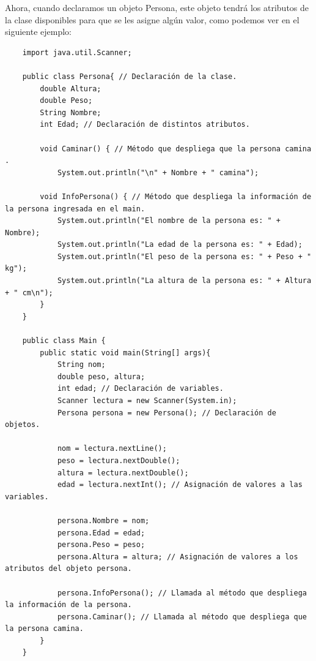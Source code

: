 Ahora, cuando declaramos un objeto Persona, este objeto tendrá los atributos de la clase disponibles para que se les asigne algún valor, como podemos ver en el siguiente ejemplo:
\begin{lstlisting}
    import java.util.Scanner;
    
    public class Persona{ // Declaración de la clase.
        double Altura;
        double Peso;
        String Nombre;
        int Edad; // Declaración de distintos atributos.
    
        void Caminar() { // Método que despliega que la persona camina .
            System.out.println("\n" + Nombre + " camina");
        
        void InfoPersona() { // Método que despliega la información de la persona ingresada en el main.
            System.out.println("El nombre de la persona es: " + Nombre);
            System.out.println("La edad de la persona es: " + Edad);
            System.out.println("El peso de la persona es: " + Peso + " kg");
            System.out.println("La altura de la persona es: " + Altura + " cm\n");
        }
    }
    
    public class Main {
        public static void main(String[] args){
            String nom;
            double peso, altura;
            int edad; // Declaración de variables.
            Scanner lectura = new Scanner(System.in);
            Persona persona = new Persona(); // Declaración de objetos.
            
            nom = lectura.nextLine();
            peso = lectura.nextDouble();
            altura = lectura.nextDouble();
            edad = lectura.nextInt(); // Asignación de valores a las variables.
            
            persona.Nombre = nom;
            persona.Edad = edad;
            persona.Peso = peso;
            persona.Altura = altura; // Asignación de valores a los atributos del objeto persona.
            
            persona.InfoPersona(); // Llamada al método que despliega la información de la persona.
            persona.Caminar(); // Llamada al método que despliega que la persona camina.
        }
    }
\end{lstlisting}


